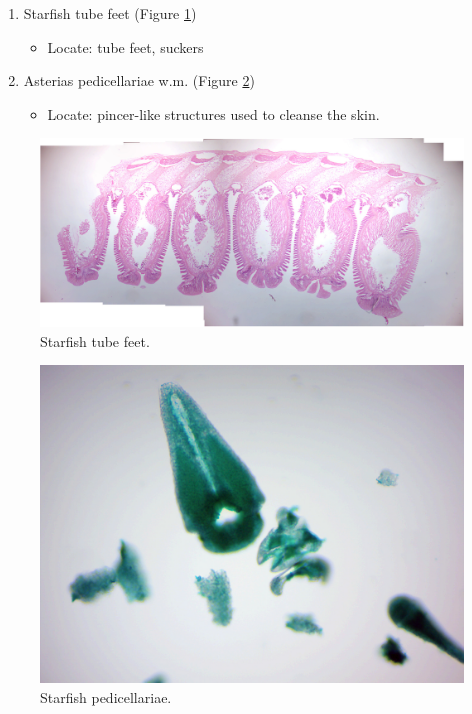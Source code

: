 \begin{enumerate}
\def\labelenumi{\arabic{enumi}.}
\tightlist
\item
  Starfish tube feet (Figure \ref{fig:tubefeet})

  \begin{itemize}
  \tightlist
  \item
    Locate: tube feet, suckers
  \end{itemize}
\item
  Asterias pedicellariae w.m. (Figure \ref{fig:pedicellariae})

  \begin{itemize}
  \tightlist
  \item
    Locate: pincer-like structures used to cleanse the skin.
  \end{itemize}
\end{enumerate}

\begin{figure}

{\centering \includegraphics[width=0.7\linewidth]{./figures/echinodermata/starfish_tubefeet}

}

\caption{Starfish tube feet.}\label{fig:tubefeet}
\end{figure}

\begin{figure}

{\centering \includegraphics[width=0.7\linewidth]{./figures/echinodermata/pedicellariae}

}

\caption{Starfish pedicellariae.}\label{fig:pedicellariae}
\end{figure}

